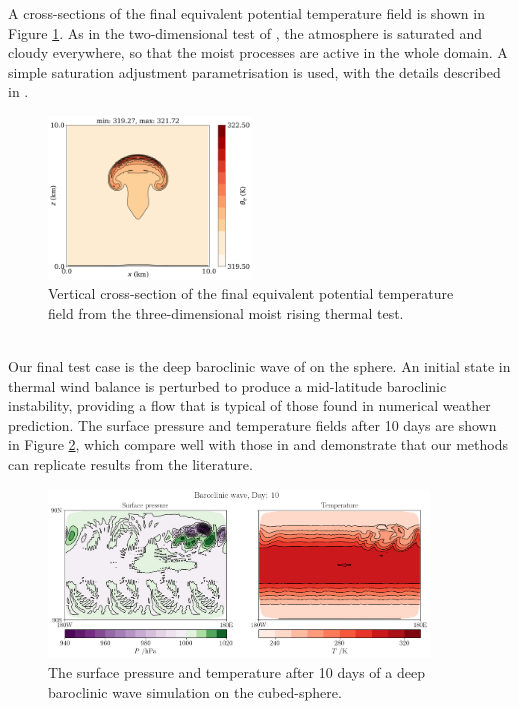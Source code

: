 \documentclass[journal abbreviation, manuscript]{copernicus}
\begin{document}
A cross-sections of the final equivalent potential temperature field is shown in Figure \ref{fig:3d_bubble}.
As in the two-dimensional test of \citet{bryan2002benchmark}, the atmosphere is saturated and cloudy everywhere, so that the moist processes are active in the whole domain.
A simple saturation adjustment parametrisation is used, with the details described in \citet{bendall2020compatible}.
\\
\begin{figure}[htp!]
\centering
\includegraphics[width=0.48\textwidth]{figures/moist_3d_bubble.png}
\caption{Vertical cross-section of the final equivalent potential temperature field from the three-dimensional moist rising thermal test.
}
\label{fig:3d_bubble}
\end{figure}
\\
Our final test case is the deep baroclinic wave of \citet{ullrich2014proposed} on the sphere.
An initial state in thermal wind balance is perturbed to produce a mid-latitude baroclinic instability, providing a flow that is typical of those found in numerical weather prediction.
The surface pressure and temperature fields after 10 days are shown in Figure \ref{fig:baroclinic}, which compare well with those in \citet{melvin2024mixed} and demonstrate that our methods can replicate results from the literature.

\begin{figure}[htp!]
\centering
\includegraphics[width=0.9\textwidth]{figures/baroclinic_wave_lonlat.png}
\caption{The surface pressure and temperature after 10 days of a deep baroclinic wave simulation on the cubed-sphere.}
\label{fig:baroclinic}
\end{figure}
\end{document}
